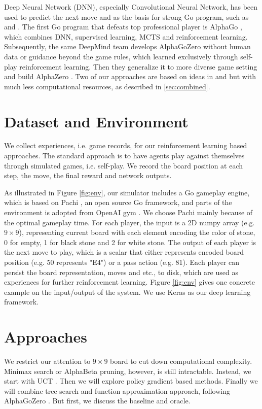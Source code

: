 \documentclass{article}
\begin{document}
Deep Neural Network (DNN), especially Convolutional Neural Network, has been used to predict the next move and as the basis for strong Go program, such as \cite{tian2015better} and \cite{maddison2014move}. The first Go program that defeats top professional player is AlphaGo \cite{silver2016mastering}, which combines DNN, supervised learning, MCTS and reinforcement learning. Subsequently, the same DeepMind team develops AlphaGoZero\cite{silver2017masteringalphagozero} without human data or guidance beyond the game rules, which learned exclusively through self-play reinforcement learning. Then they generalize it to more diverse game setting and build AlphaZero \cite{silver2017masteringalphazero}. Two of our approaches are based on ideas in \cite{silver2016mastering} and \cite{silver2017masteringalphagozero} but with much less computational resources, as described in \ref{sec:combined}.

\section{Dataset and Environment}

We collect experiences, i.e. game records, for our reinforcement learning based approaches. The standard approach is to have agents play against themselves through simulated games, i.e. self-play. We record the board position at each step,  the move, the final reward and network outputs.

As illustrated in Figure \ref{fig:env}, our simulator includes a Go gameplay engine, which is based on Pachi \cite{baudivs2011pachi}, an open source Go framework, and parts of the environment is adopted from OpenAI gym \cite{brockman2016openai}. We choose Pachi mainly because of the optimal gameplay time. For each player, the input is a 2D numpy array (e.g. $9 \times 9$), representing current board with each element encoding the color of stone, 0 for empty, 1 for black stone and 2 for white stone. The output of each player is the next move to play, which is a scalar that either represents encoded board position (e.g. 50 represents "E4") or a pass action (e.g. 81). Each player can persist the board representation, moves and etc., to disk, which are used as experiences for further reinforcement learning. Figure \ref{fig:env} gives one concrete example on the input/output of the system. We use Keras \cite{chollet2015keras} as our deep learning framework. 

\section{Approaches}
We restrict our attention to $9 \times 9$ board to cut down computational complexity. Minimax search or AlphaBeta pruning, however, is still intractable. Instead, we start with UCT \cite{kocsis2006bandit}. Then we will explore policy gradient based methods. Finally we will combine tree search and function approximation approach, following AlphaGoZero \cite{silver2017masteringalphagozero}.  But first, we discuss the baseline and oracle.
\end{document}

